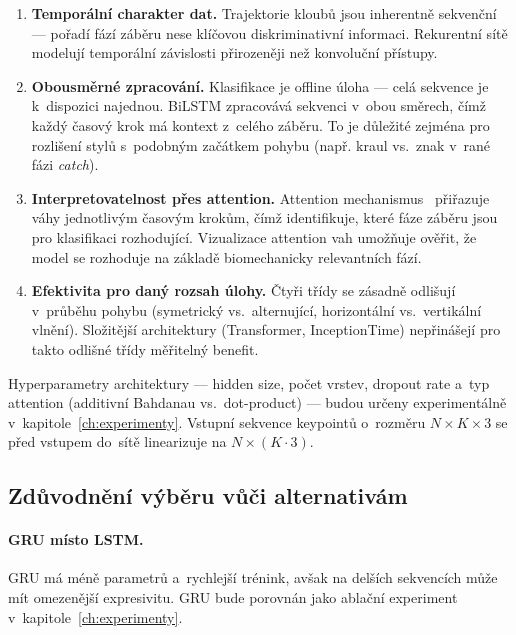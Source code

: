 \begin{enumerate}
    \item \textbf{Temporální charakter dat.} Trajektorie kloubů jsou inherentně sekvenční --- pořadí fází záběru nese klíčovou diskriminativní informaci. Rekurentní sítě modelují temporální závislosti přirozeněji než konvoluční přístupy.

    \item \textbf{Obousměrné zpracování.} Klasifikace je offline úloha --- celá sekvence je k~dispozici najednou. BiLSTM zpracovává sekvenci v~obou směrech, čímž každý časový krok má kontext z~celého záběru. To je důležité zejména pro rozlišení stylů s~podobným začátkem pohybu (např. kraul vs.\ znak v~rané fázi \textit{catch}).

    \item \textbf{Interpretovatelnost přes attention.} Attention mechanismus~\cite{bahdanau2015attention} přiřazuje váhy jednotlivým časovým krokům, čímž identifikuje, které fáze záběru jsou pro klasifikaci rozhodující. Vizualizace attention vah umožňuje ověřit, že model se rozhoduje na základě biomechanicky relevantních fází.

    \item \textbf{Efektivita pro daný rozsah úlohy.} Čtyři třídy se zásadně odlišují v~průběhu pohybu (symetrický vs.\ alternující, horizontální vs.\ vertikální vlnění). Složitější architektury (Transformer, InceptionTime) nepřinášejí pro takto odlišné třídy měřitelný benefit.
\end{enumerate}

Hyperparametry architektury --- hidden size, počet vrstev, dropout rate a~typ attention (additivní Bahdanau vs.\ dot-product) --- budou určeny experimentálně v~kapitole~\ref{ch:experimenty}. Vstupní sekvence keypointů o~rozměru $N \times K \times 3$ se před vstupem do~sítě linearizuje na $N \times (K \cdot 3)$.

\subsection{Zdůvodnění výběru vůči alternativám}

\paragraph{GRU místo LSTM.}
GRU má méně parametrů a~rychlejší trénink, avšak na delších sekvencích může mít omezenější expresivitu. GRU bude porovnán jako ablační experiment v~kapitole~\ref{ch:experimenty}.

